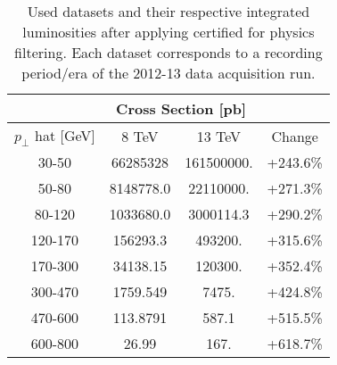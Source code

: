 \begin{table}[htp]
\centering

\begin{tabular}{|c|c|c|c|}
\hline
 & \multicolumn{2}{c|}{Cross Section [pb]} & \\
\hline
$p_\perp$ hat [GeV] & 8 TeV & 13 TeV & Change \\
\hline
\hline
30-50   & 66285328      & 161500000.   & +243.6\% \\
50-80   &  8148778.0    &  22110000.   & +271.3\% \\
80-120  &  1033680.0    &   3000114.3  & +290.2\% \\
120-170 &   156293.3    &    493200.   & +315.6\% \\
170-300 &    34138.15   &    120300.   & +352.4\% \\
300-470 &     1759.549  &      7475.   & +424.8\% \\
470-600 &      113.8791 &       587.1  & +515.5\% \\
600-800 &       26.99   &       167.   & +618.7\% \\
\hline
\end{tabular}

\caption{Used datasets and their respective integrated luminosities after applying certified for physics filtering. Each dataset corresponds to a recording period/era of the 2012-13 data acquisition run.}
\end{table}

